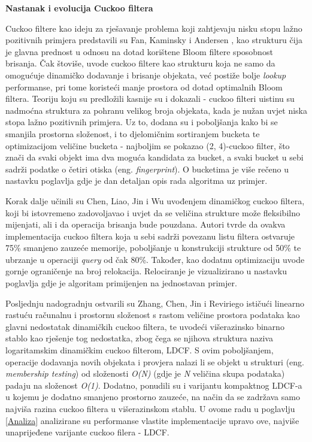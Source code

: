 \documentclass[times, utf8, seminar, numeric]{fer}
\begin{document}
\begin{flushleft}
\textbf{Nastanak i evolucija Cuckoo filtera}
\end{flushleft}

Cuckoo filtere kao ideju za rješavanje problema koji zahtjevaju nisku stopu lažno pozitivnih primjera predstavili su Fan, Kaminsky i Andersen \cite{DBLP:journals/usenix-login/FanAK13}, kao strukturu čija je glavna prednost u odnosu na dotad korištene Bloom filtere sposobnost brisanja. Čak štoviše, uvode cuckoo filtere kao strukturu koja ne samo da omogućuje dinamičko dodavanje i brisanje objekata, već postiže bolje \textit{lookup} performanse, pri tome koristeći manje prostora od dotad optimalnih Bloom filtera.
Teoriju koju su predložili kasnije su i dokazali \cite{10.1145/2674005.2674994} - cuckoo filteri uistinu su nadmoćna struktura za pohranu velikog broja objekata, kada je nužan uvjet niska stopa lažno pozitivnih primjera. Uz to, dodana su i poboljšanja kako bi se smanjila prostorna složenost, i to djelomičnim sortiranjem bucketa te optimizacijom veličine bucketa - najboljim se pokazao (2, 4)-cuckoo filter, što znači da svaki objekt ima dva moguća kandidata za bucket, a svaki bucket u sebi sadrži podatke o četiri otiska (eng. \textit{fingerprint}). O bucketima je više rečeno u nastavku poglavlja gdje je dan detaljan opis rada algoritma uz primjer.

Korak dalje učinili su Chen, Liao, Jin i Wu \cite{8117563} uvođenjem dinamičkog cuckoo filtera, koji bi istovremeno zadovoljavao i uvjet da se veličina strukture može fleksibilno mijenjati, ali i da operacija brisanja bude pouzdana. Autori tvrde da ovakva implementacija cuckoo filtera koja u sebi sadrži povezanu listu filtera ostvaruje 75\% smanjeno zauzeće memorije, poboljšanje u konstrukciji strukture od 50\% te ubrzanje u operaciji \textit{query} od čak 80\%. Također, kao dodatnu optimizaciju uvode gornje ograničenje na broj relokacija. Relociranje je vizualizirano u nastavku poglavlja gdje je algoritam primijenjen na jednostavan primjer.

Posljednju nadogradnju ostvarili su Zhang, Chen, Jin i Reviriego \cite{9458864} ističući linearno rastuću računalnu i prostornu složenost s rastom veličine prostora podataka kao glavni nedostatak dinamičkih cuckoo filtera, te uvodeći višerazinsko binarno stablo kao rješenje tog nedostatka, zbog čega se njihova struktura naziva logaritamskim dinamičkim cuckoo filterom, LDCF. S ovim poboljšanjem, operacije dodavanja novih objekata i provjera nalazi li se objekt u strukturi (eng. \textit{membership testing}) od složenosti \textit{O(N)} (gdje je \textit{N} veličina skupa podataka) padaju na složenost \textit{O(1)}. Dodatno, ponudili su i varijantu kompaktnog LDCF-a u kojemu je dodatno smanjeno prostorno zauzeće, na način da se zadržava samo najviša razina cuckoo filtera u višerazinskom stablu. U ovome radu u poglavlju \ref{Analiza} analizirane su performanse vlastite implementacije upravo ove, najviše unaprijeđene varijante cuckoo filera - LDCF.
\end{document}
